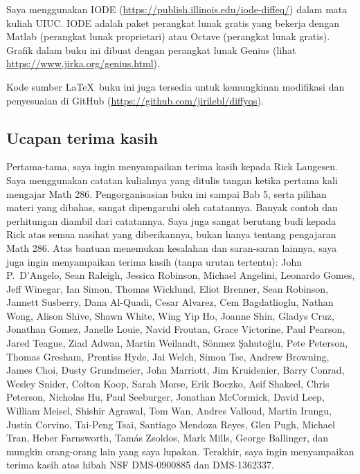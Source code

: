 Saya menggunakan IODE
(\url{https://publish.illinois.edu/iode-diffeq/})
dalam mata kuliah UIUC.
IODE adalah paket perangkat lunak gratis yang
bekerja dengan Matlab (perangkat lunak proprietari) atau Octave (perangkat lunak gratis).
Grafik dalam buku ini dibuat dengan
perangkat lunak Genius
(lihat \url{https://www.jirka.org/genius.html}).

Kode sumber \LaTeX\ buku ini juga tersedia
untuk kemungkinan modifikasi dan penyesuaian
di GitHub (\url{https://github.com/jirilebl/diffyqs}).



\subsection{Ucapan terima kasih}

Pertama-tama, saya ingin menyampaikan terima kasih kepada Rick Laugesen. Saya menggunakan catatan kuliahnya yang ditulis tangan
ketika pertama kali mengajar
Math 286. Pengorganisasian buku ini sampai Bab 5,
serta pilihan
materi yang dibahas, sangat dipengaruhi oleh catatannya. Banyak
contoh dan perhitungan diambil dari catatannya. Saya juga sangat berutang budi kepada Rick atas semua nasihat yang diberikannya, bukan hanya tentang pengajaran
Math 286.
Atas bantuan menemukan kesalahan dan saran-saran lainnya,
saya juga ingin menyampaikan terima kasih (tanpa urutan tertentu):
John P.\ D'Angelo,
Sean Raleigh, Jessica Robinson, Michael Angelini, Leonardo Gomes, Jeff
Winegar, Ian Simon, Thomas Wicklund, Eliot Brenner, Sean Robinson,
Jannett Susberry, Dana Al-Quadi, Cesar Alvarez, Cem Bagdatlioglu,
Nathan Wong, Alison Shive, Shawn White, Wing Yip Ho, Joanne Shin,
Gladys Cruz, Jonathan Gomez, Janelle Louie, Navid Froutan,
Grace Victorine, Paul Pearson, Jared Teague, Ziad Adwan,
Martin Weilandt, S\"{o}nmez \c{S}ahuto\u{g}lu,
Pete Peterson, Thomas Gresham, Prentiss Hyde, Jai Welch,
Simon Tse, Andrew Browning, James Choi, Dusty Grundmeier,
John Marriott,
Jim Kruidenier,
Barry Conrad,
Wesley Snider,
Colton Koop,
Sarah Morse,
Erik Boczko,
Asif Shakeel,
Chris Peterson,
Nicholas Hu,
Paul Seeburger,
Jonathan McCormick,
David Leep,
William Meisel,
Shishir Agrawal,
Tom Wan,
Andres Valloud,
Martin Irungu,
Justin Corvino,
Tai-Peng Tsai,
Santiago Mendoza Reyes,
Glen Pugh,
Michael Tran,
Heber Farnsworth,
Tam\'as Zsoldos,
Mark Mills,
George Ballinger,
dan mungkin orang-orang lain yang saya lupakan.
Terakhir, saya ingin menyampaikan terima kasih atas hibah NSF DMS-0900885 dan DMS-1362337.


